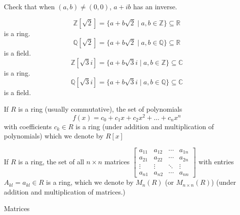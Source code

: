 \begin{rem}
Check that when $(a,b)\neq (0,0)$, $a+ib$ has an inverse.
\end{rem}

\begin{exmp}
\[\mathbb{Z}[\sqrt{2}] = \{a+b\sqrt{2} \mid a,b\in \mathbb{Z}\} \subseteq \mathbb{R}\] is a ring.
\[\mathbb{Q}[\sqrt{2}] = \{a+b\sqrt{2} \mid a,b\in \mathbb{Q}\} \subseteq \mathbb{R}\] is a field.
\[\mathbb{Z}[\sqrt{3}i] = \{a+b\sqrt{3}i \mid a,b\in \mathbb{Z}\} \subseteq \mathbb{C}\] is a ring.
\[\mathbb{Q}[\sqrt{3}i] = \{a+b\sqrt{3}i \mid a,b\in \mathbb{Q}\} \subseteq \mathbb{C}\] is a field.
\end{exmp}

\begin{exmp}
If $R$ is a ring (usually commutative), the set of polynomials \[f(x) = c_0 + c_1x + c_2x^2+ \dots + c_nx^n\] with coefficients $c_k\in R$ is a ring (under addition and multiplication of polynomials) which we denote by $R[x]$
\end{exmp}

\begin{exmp}
If $R$ is a ring, the set of all $n\times n$ matrices
\begin{math}
 \begin{bmatrix}
 a_{11} & a_{12} & \cdots & a_{1n} \\
 a_{21} & a_{22} & \cdots & a_{2n} \\
 \vdots & \vdots & \ddots & \vdots \\
 a_{n1} & a_{n2} & \cdots & a_{nn}
 \end{bmatrix}
 \end{math}
 with entries $A_{kl} = a_{kl} \in R$ is a ring, which we denote by $M_n(R)$ (or $M_{n\times n} (R)$) (under addition and multiplication of matrices.)
\end{exmp}

\begin{rem}
Matrices
\end{rem}